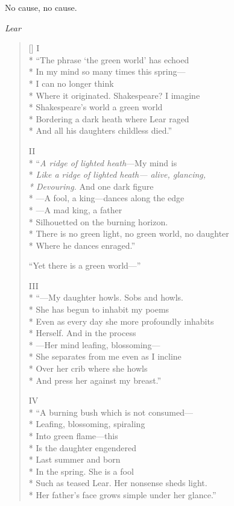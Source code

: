 \label{ch:amotherwatching}
\begingroup
\setlength{\epigraphwidth}{2.25cm}
\epigraph{No cause, no cause.}{\textit{Lear}}
\endgroup
\settowidth{\versewidth}{There is no green light, no green world, no daughter}
\begin{verse}[\versewidth]
I\\*
 ``The phrase `the green world' has echoed\\*
In my mind so many times this spring---\\*
I can no longer think\\*
Where it originated.  Shakespeare?   I imagine \\*
Shakespeare's world a green world\\*
Bordering a dark heath where Lear raged\\*
And all his daughters childless died.''

II\\*
``\textit{A ridge of lighted heath}---My mind is \\*
\textit{Like a ridge of lighted heath--- alive, glancing,\\*
Devouring.} And one dark figure\\*
---A fool, a king---dances along the edge\\*
---A mad king, a father\\*
Silhouetted on the burning horizon.\\*
There is no green light, no green world, no daughter\\*
Where he dances enraged.''

``Yet there is a green world---''

III\\*
``---My daughter howls. Sobs and howls.\\*
She has begun to inhabit my poems\\*
Even as every day she more profoundly inhabits\\*
Herself. And in the process\\*
---Her mind leafing, blossoming---\\*
She separates from me even as I incline\\*
Over her crib where she howls\\*
And press her against my breast.''

IV\\*
``A burning bush which is not consumed---\\*
Leafing, blossoming, spiraling\\*
Into green flame---this\\*
Is the daughter engendered\\*
Last summer and born\\*
In the spring. She is a fool\\*
Such as teased Lear. Her nonsense sheds light.\\*
Her father's face grows simple under her glance.''


\end{verse}
